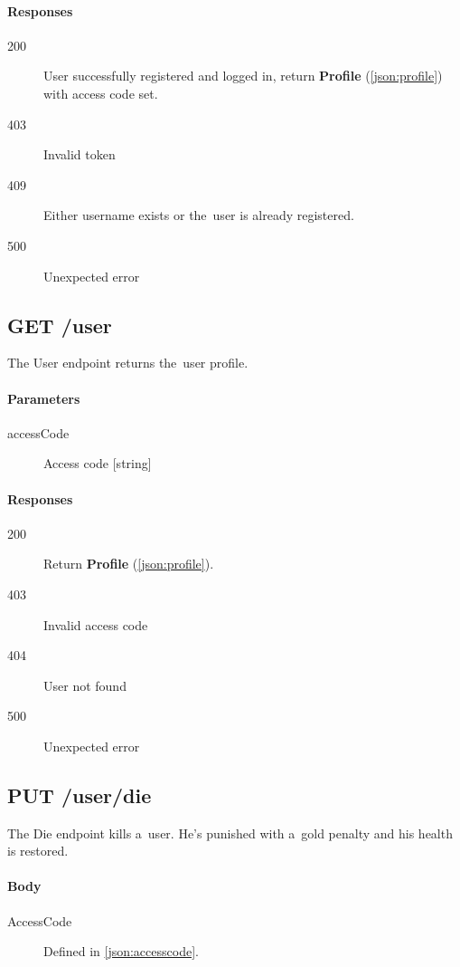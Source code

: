 		\paragraph*{Responses}
			\begin{description}
				\item[200] User successfully registered and logged in, return \textbf{Profile} (\ref{json:profile}) with access code set.
				\item[403] Invalid token
				\item[409] Either username exists or the~user is already registered.
				\item[500] Unexpected error
			\end{description}	

	\subsection{GET /user}
	The User endpoint returns the~user profile.
		\paragraph*{Parameters}
			\begin{description}
				\item[accessCode] Access code [string]
			\end{description}
		\paragraph*{Responses}
			\begin{description}
				\item[200] Return \textbf{Profile} (\ref{json:profile}).
				\item[403] Invalid access code
				\item[404] User not found
				\item[500] Unexpected error
			\end{description}

	
	\subsection{PUT /user/die}	
	The Die endpoint kills a~user. He's punished with a~gold penalty and his health is restored.
		\paragraph*{Body}
			\begin{description}
				\item[AccessCode] Defined in \ref{json:accesscode}.
			\end{description}
